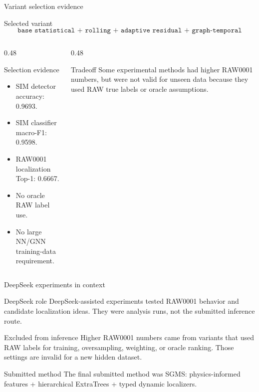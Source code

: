 ﻿\documentclass[10pt,aspectratio=169]{beamer}
\begin{document}
\begin{frame}{Variant selection evidence}
\small
\begin{block}{Selected variant}
\[
\texttt{base statistical + rolling + adaptive residual + graph-temporal}
\]
\end{block}
\begin{columns}[T,totalwidth=\textwidth]
\begin{column}{0.48\textwidth}
\begin{exampleblock}{Selection evidence}
\begin{itemize}
  \item SIM detector accuracy: 0.9693.
  \item SIM classifier macro-F1: 0.9598.
  \item RAW0001 localization Top-1: 0.6667.
  \item No oracle RAW label use.
  \item No large NN/GNN training-data requirement.
\end{itemize}
\end{exampleblock}
\end{column}
\begin{column}{0.48\textwidth}
\begin{alertblock}{Tradeoff}
Some experimental methods had higher RAW0001 numbers, but were not valid for unseen data because they used RAW true labels or oracle assumptions.
\end{alertblock}
\end{column}
\end{columns}
\end{frame}

\begin{frame}{DeepSeek experiments in context}
\small
\begin{block}{DeepSeek role}
DeepSeek-assisted experiments tested RAW0001 behavior and candidate localization ideas. They were analysis runs, not the submitted inference route.
\end{block}
\begin{alertblock}{Excluded from inference}
Higher RAW0001 numbers came from variants that used RAW labels for training, oversampling, weighting, or oracle ranking. Those settings are invalid for a new hidden dataset.
\end{alertblock}
\begin{exampleblock}{Submitted method}
The final submitted method was SGMS: physics-informed features + hierarchical ExtraTrees + typed dynamic localizers.
\end{exampleblock}
\end{frame}
\end{document}
